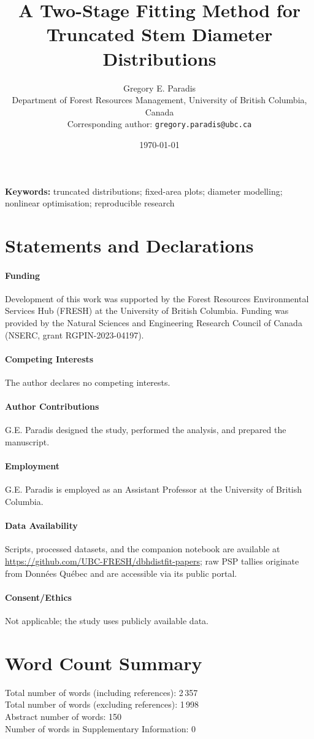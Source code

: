 \documentclass[12pt]{article}
\title{A Two-Stage Fitting Method for Truncated Stem Diameter Distributions}
\author{Gregory E. Paradis\\Department of Forest Resources Management, University of British Columbia, Canada\\Corresponding author: \texttt{gregory.paradis@ubc.ca}}
\date{\today}
\begin{document}
\maketitle

\noindent\textbf{Keywords:} truncated distributions; fixed-area plots; diameter modelling; nonlinear optimisation; reproducible research








\section*{Statements and Declarations}
\paragraph{Funding} Development of this work was supported by the Forest Resources Environmental Services Hub (FRESH) at the University of British Columbia. Funding was provided by the Natural Sciences and Engineering Research Council of Canada (NSERC, grant RGPIN-2023-04197).
\paragraph{Competing Interests} The author declares no competing interests.
\paragraph{Author Contributions} G.E. Paradis designed the study, performed the analysis, and prepared the manuscript.
\paragraph{Employment} G.E. Paradis is employed as an Assistant Professor at the University of British Columbia.
\paragraph{Data Availability} Scripts, processed datasets, and the companion notebook are available at \url{https://github.com/UBC-FRESH/dbhdistfit-papers}; raw PSP tallies originate from Donn\'ees Qu\'ebec and are accessible via its public portal.
\paragraph{Consent/Ethics} Not applicable; the study uses publicly available data.

\appendix


\section*{Word Count Summary}
Total number of words (including references): 2\,357\\
Total number of words (excluding references): 1\,998\\
Abstract number of words: 150\\
Number of words in Supplementary Information: 0



\end{document}
